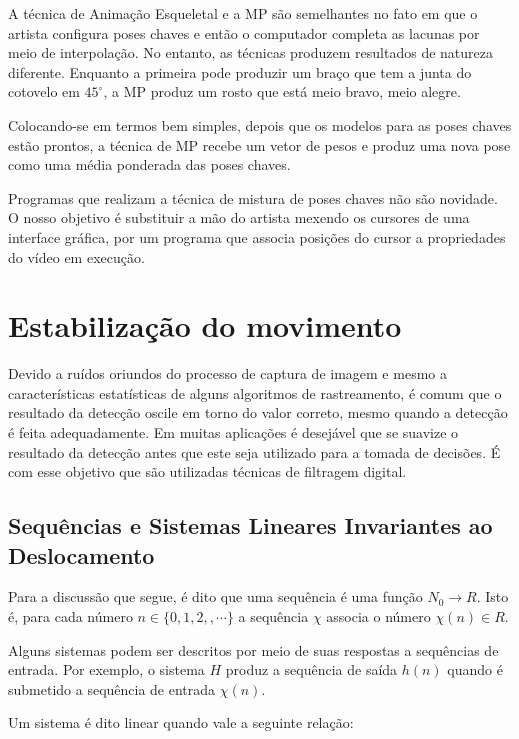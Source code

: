 {\begin{itemize}
\end{itemize}

A técnica de Animação Esqueletal e a MP são semelhantes no fato em que o artista
configura poses chaves e então o computador completa as lacunas por meio de
interpolação. No entanto, as técnicas produzem resultados de natureza diferente.
Enquanto a primeira pode produzir um braço que tem a junta do cotovelo em
$45^\circ$, a MP produz um rosto que está meio bravo, meio alegre.

Colocando-se em termos bem simples, depois que os modelos para as poses chaves
estão prontos, a técnica de MP recebe um vetor de pesos e produz uma nova pose
como uma média ponderada das poses chaves.

  Programas que realizam a técnica de mistura de poses chaves não são novidade.
  O nosso objetivo é substituir a mão do artista mexendo os cursores de uma
  interface gráfica, por um programa que associa posições do cursor a
  propriedades do vídeo em execução.


\section{Estabilização do movimento}

Devido a ruídos oriundos do processo de captura de imagem e mesmo a
características estatísticas de alguns algoritmos de rastreamento, é comum que o
resultado da detecção oscile em torno do valor correto, mesmo quando a detecção
é feita adequadamente. Em muitas aplicações é desejável que se suavize o
resultado da detecção antes que este seja utilizado para a tomada de decisões. É
com esse objetivo que são utilizadas técnicas de filtragem digital. 

\subsection{Sequências e Sistemas Lineares Invariantes ao Deslocamento}
 
Para a discussão que segue, é dito que uma sequência é uma função $N_0
\rightarrow R$. Isto é, para cada número $n\in \{0,1,2,,\cdots\}$ a sequência
$\chi$ associa o número $\chi(n) \in R$.

Alguns sistemas podem ser descritos por meio de suas respostas a sequências de
entrada. Por exemplo, o sistema $H$  produz a sequência de saída $h(n)$ quando é
submetido a sequência de entrada $\chi(n)$.

Um sistema é dito linear quando vale a seguinte relação:

}
